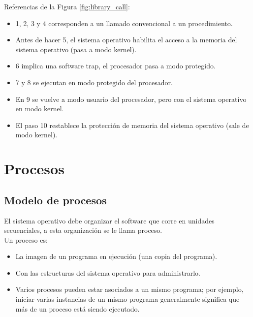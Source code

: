 \documentclass[a4paper, twoside]{article}
\begin{document}
Referencias de la Figura \ref{fig:library_call}:
\begin{itemize}
	\item 1, 2, 3 y 4 corresponden a un llamado convencional a un procedimiento.
	\item Antes de hacer 5, el sistema operativo habilita el acceso a la memoria del sistema operativo (pasa a modo kernel).
	\item 6 implica una software trap, el procesador pasa a modo protegido.
	\item 7 y 8 se ejecutan en modo protegido del procesador.
	\item En 9 se vuelve a modo usuario del procesador, pero con el sistema operativo en modo kernel.
	\item El paso 10 restablece la protección de memoria del sistema operativo (sale de modo kernel).
\end{itemize}

\newpage
\section{Procesos}
\subsection{Modelo de procesos}
El sistema operativo debe organizar el software que corre en unidades secuenciales, a esta organización se le llama proceso.\\

Un proceso es:
\begin{itemize}
	\item La imagen de un programa en ejecución (una copia del programa).
	\item Con las estructuras del sistema operativo para administrarlo.
	\item Varios procesos pueden estar asociados a un mismo programa; por ejemplo, iniciar varias instancias de un mismo programa generalmente significa que más de un proceso está siendo ejecutado.
\end{itemize}
\end{document}

